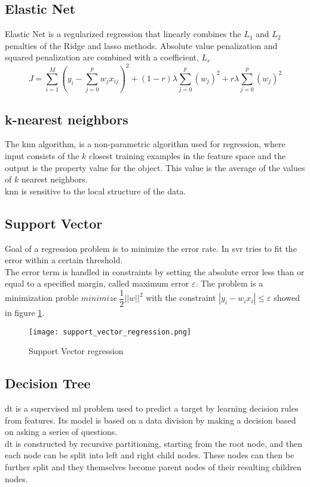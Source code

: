 \subsection{Elastic Net}
Elastic Net is a regularized regression that linearly combines the $L_1$ and $L_2$ penalties of the Ridge and \gls{lasso} methods. Absolute value penalization and squared penalization are combined with a coefficient, $L_{r}$
\begin{equation}
	J=\sum_{i=1}^{M}{{ \left( y_i-\sum_{j=0}^{p}{w_jx_{ij}} \right) }^2}+(1-r) \lambda \sum_{j=0}^{p}{{(w_j)}^2}+r \lambda \sum_{j=0}^{p}{{(w_j)}^2}
\end{equation}\label{elasticnet_eq}

\subsection{k-nearest neighbors}
The \gls{knn} algorithm, is a non-parametric algorithm used for regression, where input consists of the $k$ closest training examples in the feature space and the output is the property value for the object. This value is the average of the values of $k$ nearest neighbors.
\\
\gls{knn} is sensitive to the local structure of the data.

\subsection{Support Vector}
Goal of a regression problem is to minimize the error rate. In \gls{svr} tries to fit the error within a certain threshold.
\\
The error term is handled in constraints by setting the absolute error less than or equal to a specified margin, called maximum error $\varepsilon$. The problem is a minimization proble $minimize \: \dfrac{1}{2}||w||^2$ with the constraint $|y_i-w_ix_i| \leq \varepsilon$ showed in figure \ref{fig:support_vector_regression}.
\begin{figure}[h]
    \centering
    \texttt{[image: support\_vector\_regression.png]} 
	\caption{Support Vector regression}
    \label{fig:support_vector_regression}
\end{figure} 

\subsection{Decision Tree}
\gls{dt} is a supervised \gls{ml} problem used to predict a target by learning decision rules from features. Its model is based on a data division by making a decision based on asking a series of questions.
\\ \indent
\gls{dt} is constructed by recursive partitioning, starting from the root node, and then each node can be split into left and right child nodes. These nodes can then be further split and they themselves become parent nodes of their resulting children nodes.

